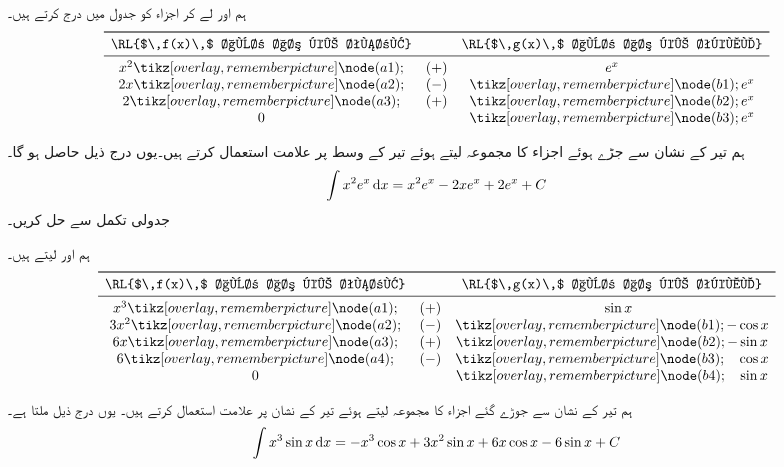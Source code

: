 ہم  اور  لے کر اجزاء کو جدول میں درج کرتے ہیں۔
\begin{align*}
\begin{array}{ccc}
\toprule
\text{\RL{$\,f(x)\,$ اور اس کے تفرق}}&&\text{\RL{$\,g(x)\,$ اور اس کے تکمل}}\\
\midrule
x^2\tikzmark{a1}&(+)&e^x\\
2x\tikzmark{a2}&(-)&\tikzmark{b1}e^x\\
2\tikzmark{a3}&(+)&\tikzmark{b2}e^x\\
0&&\tikzmark{b3}e^x
\end{array}
\end{align*}
ہم تیر کے نشان سے جڑے ہوئے اجزاء کا مجموعہ لیتے ہوئے تیر کے وسط پر علامت استعمال کرتے ہیں۔یوں درج ذیل حاصل ہو گا۔
\begin{align*}
\int x^2e^x\dif x=x^2e^x-2xe^x+2e^x+C
\end{align*}
جدولی تکمل سے  حل کریں۔

ہم  اور  لیتے ہیں۔
\begin{align*}
\begin{array}{ccc}
\toprule
\text{\RL{$\,f(x)\,$ اور اس کے تفرق}}&&\text{\RL{$\,g(x)\,$ اور اس کے تکمل}}\\
\midrule
x^3\tikzmark{a1}&(+)&\phantom{+}\sin x\\
3x^2\tikzmark{a2}&(-)&\tikzmark{b1}-\cos x\\
6x\tikzmark{a3}&(+)&\tikzmark{b2}-\sin x\\
6\tikzmark{a4}&(-)&\tikzmark{b3}\phantom{-}\cos x\\
0&&\tikzmark{b4}\phantom{-}\sin x
\end{array}
\end{align*}
ہم تیر کے نشان سے جوڑے گئے اجزاء کا مجموعہ لیتے ہوئے تیر کے  نشان پر علامت استعمال کرتے ہیں۔ یوں درج ذیل ملتا ہے۔
\begin{align*}
\int x^3\sin x\dif x=-x^3\cos x+3x^2\sin x+6x\cos x-6\sin x+C
\end{align*}

